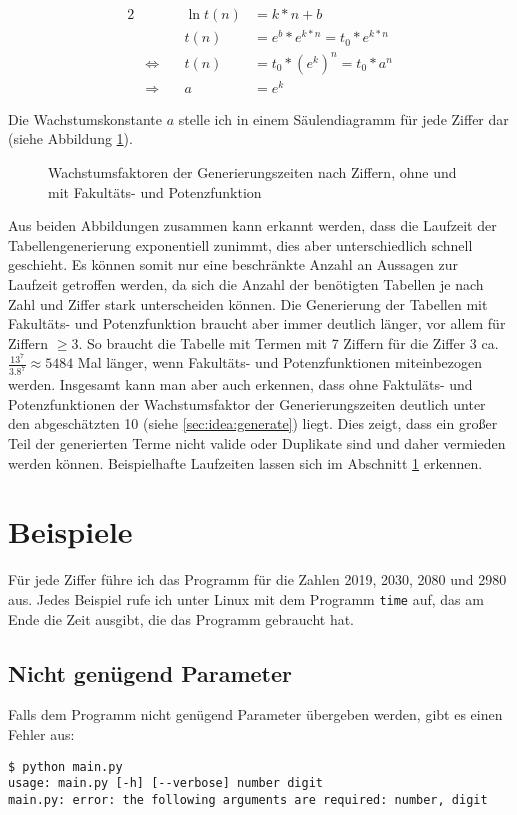 \documentclass[a4paper,10pt,ngerman]{scrartcl}
\begin{document}
\begin{alignat*}{2}
  & & \ln{t(n)} &= k*n + b \\
  & & t(n) &= e^b * e^{k*n} = t_0 * e^{k*n} \\
  &\Leftrightarrow \quad& t(n) &= t_0 * (e^k)^n = t_0 * a^n \\
  &\Rightarrow \quad& a &= e^k
\end{alignat*}

Die Wachstumskonstante $a$ stelle ich in einem Säulendiagramm für jede Ziffer dar (siehe Abbildung \ref{fig:implementation:runtime:2}).

\begin{figure}
  \centering
  
  \caption{Wachstumsfaktoren der Generierungszeiten nach Ziffern, ohne und mit Fakultäts- und Potenzfunktion}
  \label{fig:implementation:runtime:2}
\end{figure}

Aus beiden Abbildungen zusammen kann erkannt werden, dass die Laufzeit der Tabellengenerierung exponentiell zunimmt, dies aber unterschiedlich schnell geschieht.
Es können somit nur eine beschränkte Anzahl an Aussagen zur Laufzeit getroffen werden, da sich die Anzahl der benötigten Tabellen je nach Zahl und Ziffer stark unterscheiden können.
Die Generierung der Tabellen mit Fakultäts- und Potenzfunktion braucht aber immer deutlich länger, vor allem für Ziffern $\ge 3$.
So braucht die Tabelle mit Termen mit 7 Ziffern für die Ziffer 3 ca. $\frac{13^7}{3.8^7} \approx 5484$ Mal länger, wenn Fakultäts- und Potenzfunktionen miteinbezogen werden.
Insgesamt kann man aber auch erkennen, dass ohne Faktuläts- und Potenzfunktionen der Wachstumsfaktor der Generierungszeiten deutlich unter den abgeschätzten 10 (siehe \ref{sec:idea:generate}) liegt. 
Dies zeigt, dass ein großer Teil der generierten Terme nicht valide oder Duplikate sind und daher vermieden werden können.
Beispielhafte Laufzeiten lassen sich im Abschnitt \ref{sec:examples} erkennen.

\section{Beispiele}
\label{sec:examples}
Für jede Ziffer führe ich das Programm für die Zahlen 2019, 2030, 2080 und 2980 aus.
Jedes Beispiel rufe ich unter Linux mit dem Programm \texttt{time} auf, das am Ende die Zeit ausgibt, die das Programm gebraucht hat.


\subsection{Nicht genügend Parameter}
Falls dem Programm nicht genügend Parameter übergeben werden, gibt es einen Fehler aus:
\begin{lstlisting}
$ python main.py 
usage: main.py [-h] [--verbose] number digit
main.py: error: the following arguments are required: number, digit
\end{lstlisting}
\end{document}
